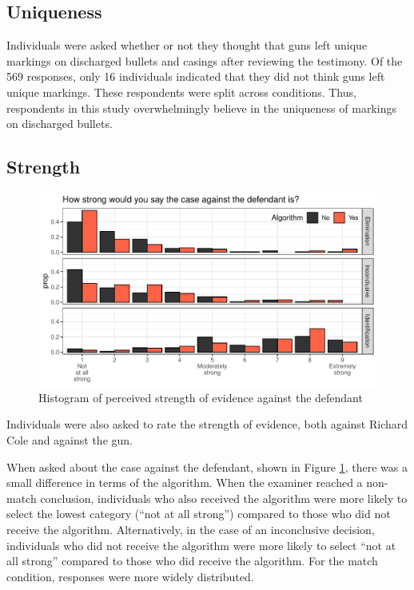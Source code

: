 \documentclass[print]{nuthesis}
\begin{document}
\hypertarget{uniqueness}{%
\subsection{Uniqueness}\label{uniqueness}}

Individuals were asked whether or not they thought that guns left unique markings on discharged bullets and casings after reviewing the testimony.
Of the 569 responses, only 16 individuals indicated that they did not think guns left unique markings.
These respondents were split across conditions.
Thus, respondents in this study overwhelmingly believe in the uniqueness of markings on discharged bullets.

\hypertarget{strength}{%
\subsection{Strength}\label{strength}}

\begin{figure}

{\centering \includegraphics[width=\linewidth]{thesis_files/figure-latex/strength-1} 

}

\caption{Histogram of perceived strength of evidence against the defendant}\label{fig:strength}
\end{figure}

Individuals were also asked to rate the strength of evidence, both against Richard Cole and against the gun.

When asked about the case against the defendant, shown in Figure \ref{fig:strength}, there was a small difference in terms of the algorithm.
When the examiner reached a non-match conclusion, individuals who also received the algorithm were more likely to select the lowest category (``not at all strong'') compared to those who did not receive the algorithm.
Alternatively, in the case of an inconclusive decision, individuals who did not receive the algorithm were more likely to select ``not at all strong'' compared to those who did receive the algorithm.
For the match condition, responses were more widely distributed.
\end{document}
